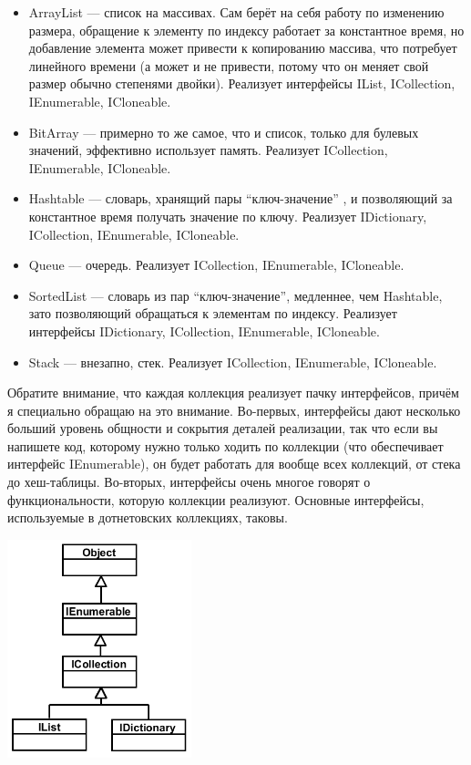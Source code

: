 \documentclass[a5paper]{article}
\begin{document}
\begin{itemize}
    \item ArrayList --- список на массивах. Сам берёт на себя работу по изменению размера, обращение к элементу по индексу работает за константное время, но добавление элемента может привести к копированию массива, что потребует линейного времени (а может и не привести, потому что он меняет свой размер обычно степенями двойки). Реализует интерфейсы IList, ICollection, IEnumerable, ICloneable.
    \item BitArray --- примерно то же самое, что и список, только для булевых значений, эффективно использует память. Реализует ICollection, IEnumerable, ICloneable.
    \item Hashtable --- словарь, хранящий пары ``ключ-значение'' , и позволяющий за константное время получать значение по ключу. Реализует IDictionary, ICollection, IEnumerable, ICloneable.
    \item Queue --- очередь. Реализует ICollection, IEnumerable, ICloneable.
    \item SortedList --- словарь из пар ``ключ-значение'', медленнее, чем Hashtable, зато позволяющий обращаться к элементам по индексу. Реализует интерфейсы IDictionary, ICollection, IEnumerable, ICloneable.
    \item Stack --- внезапно, стек. Реализует ICollection, IEnumerable, ICloneable.
\end{itemize}

Обратите внимание, что каждая коллекция реализует пачку интерфейсов, причём я специально обращаю на это внимание. Во-первых, интерфейсы дают несколько больший уровень общности и сокрытия деталей реализации, так что если вы напишете код, которому нужно только ходить по коллекции (что обеспечивает интерфейс IEnumerable), он будет работать для вообще всех коллекций, от стека до хеш-таблицы. Во-вторых, интерфейсы очень многое говорят о функциональности, которую коллекции реализуют. Основные интерфейсы, используемые в дотнетовских коллекциях, таковы.

\begin{center}
    \includegraphics[width=0.4\textwidth]{interfaces.png}
\end{center}
\end{document}
